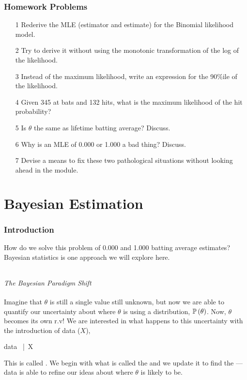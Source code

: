 \documentclass[slides]{beamer} %
\begin{document}
\begin{frame}
	\frametitle{Homework Problems}
\begin{enumerate}
\item[1] Rederive the MLE (estimator and estimate) for the Binomial likelihood model.
\item[2] Try to derive it without using the monotonic transformation of the log of the likelihood.
\item[3] Instead of the maximum likelihood, write an expression for the 90\%ile of the likelihood.
\item[4] Given 345 at bats and 132 hits, what is the maximum likelihood of the hit probability?
\item[5] Is $\theta$ the same as lifetime batting average? Discuss.
\item[6] Why is an MLE of 0.000 or 1.000 a bad thing? Discuss.
\item[7] Devise a means to fix these two pathological situations without looking ahead in the module.
\end{enumerate}
\end{frame}	

\section{Bayesian Estimation}

\begin{frame}
	\frametitle{Introduction}

How do we solve this problem of 0.000 and 1.000 batting average estimates? \pause  Bayesian statistics is one approach we will explore here. \\~\\\pause 

\emph{The Bayesian Paradigm Shift} \\ ~ \\

Imagine that $\theta$ is still a single value still unknown, \pause but now we are able to quantify our uncertainty about where $\theta$ is using a distribution, $\mathbb{P}\left(\theta\right)$. \pause Now, $\theta$ becomes its own r.v! \pause  We are interested in what happens to this uncertainty with the introduction of data ($X$), \pause 

\beqn
\theta \quad \buildrel data \over \longrightarrow \quad\theta~|~X
\eeqn

This is called . \pause We begin with what is called the  and we update it to find the  --- data is able to refine our ideas about where $\theta$ is likely to be.

\end{frame}
\end{document}
